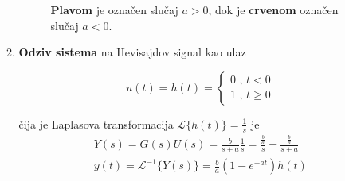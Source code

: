 \documentclass[12pt]{IEEEtran}
\numberwithin{equation}{subsection}
\numberwithin{figure}{section}
\begin{document}
\begin{enumerate}
\begin{enumerate}
                    \begin{figure}[h]
                        \centering
                        \caption{\textbf{Plavom} je ozna\v{c}en slu\v{c}aj $a > 0$, dok je
                            \textbf{crvenom} ozna\v{c}en slu\v{c}aj $a < 0$.}
                    \end{figure}

                    \newpage
              \item
                    \textbf{Odziv sistema} na Hevisajdov signal kao ulaz

                    \begin{equation}
                        u(t) = h(t) = \begin{cases}
                            0 \text{ , } t < 0 \\
                            1 \text{ , } t \geq 0
                        \end{cases}
                    \end{equation}

                    \v{c}ija je Laplasova transformacija $\mathcal{L}\{h(t)\} = \frac{1}{s}$ je
                    \begin{gather}
                        Y(s) = G(s)U(s) = \frac{b}{s+a}\frac{1}{s} = \frac{\frac{b}{a}}{s} - \frac{\frac{b}{a}}{s + a}\\
                        y(t) = \mathcal{L}^{-1}\{Y(s)\} = \frac{b}{a}(1-e^{-at})h(t)
                    \end{gather}


\end{enumerate}
\end{enumerate}
\end{document}
